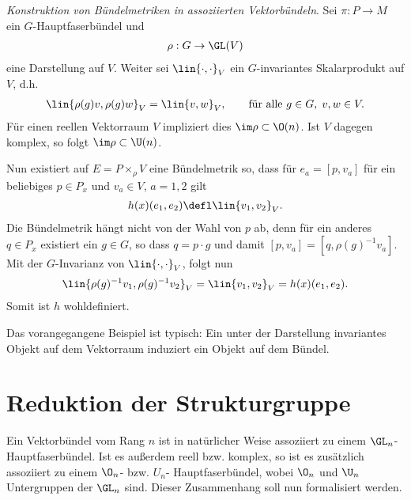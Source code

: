 \documentclass[%
	paper=a5,%
	fleqn,%
	DIV=18,%
	BCOR=0mm,
	fontsize=11pt,
	titlepage=false,%
	bibliography=totoc,
	DIV=18,%
	twoside=true,
	pdftitle=Riemannsche Geometrie,
	pdfauthor=Uwe Semmelmann,
	numbers=noendperiod]%
	{scrbook}
\begin{document}
\begin{ex}
\begin{exenum}
\item \textit{Konstruktion von Bündelmetriken in assoziierten Vektorbündeln}.
Sei $\pi: P\to M$ ein $G$-Hauptfaserbündel und
\begin{align*}
\rho: G\to \GL(V)
\end{align*}
eine Darstellung auf $V$. Weiter sei $\lin{\cdot,\cdot}_V$ ein $G$-invariantes
Skalarprodukt auf $V$, d.h.
\begin{align*}
\lin{\rho(g)v,\rho(g)w}_V = \lin{v,w}_V,\qquad \text{für alle }g\in G,\; v,w\in
V.
\end{align*}
Für einen reellen Vektorraum $V$ impliziert dies $\im
\rho\subset\O(n)$. Ist $V$ dagegen komplex, so folgt $\im\rho\subset\U(n)$.

Nun existiert auf $E=P\times_\rho V$ eine Bündelmetrik so, dass für $e_a =
[p,v_a]$ für ein beliebiges $p\in P_x$ und $v_a\in V$, $a=1,2$ gilt
\begin{align*}
h(x)(e_1,e_2) \defl \lin{v_1,v_2}_V.
\end{align*}
Die Bündelmetrik hängt nicht von der Wahl von $p$ ab, denn für ein anderes
$q\in P_x$ existiert ein $g\in G$, so dass $q = p\cdot g$ und damit $[p,v_a] =
[q,\rho(g)^{-1} v_a]$. Mit der $G$-Invarianz von $\lin{\cdot,\cdot}_V$, folgt
nun
\begin{align*}
\lin{\rho(g)^{-1}v_1,\rho(g)^{-1}v_2}_V = \lin{v_1,v_2}_V = h(x)(e_1,e_2).
\end{align*}
Somit ist $h$ wohldefiniert.
\item Das vorangegangene Beispiel ist typisch: Ein unter der Darstellung
invariantes Objekt auf dem Vektorraum induziert ein Objekt auf dem Bündel.\bsp  
\end{exenum}
\end{ex}

\section{Reduktion der Strukturgruppe}

Ein Vektorbündel vom Rang $n$ ist in natürlicher Weise assoziiert zu einem
$\GL_n$-Hauptfaserbündel. Ist es außerdem reell bzw. komplex, so ist es
zusätzlich assoziiert zu einem $\O_n$- bzw. $U_n$- Hauptfaserbündel, wobei
$\O_n$ und $\U_n$ Untergruppen der $\GL_n$ sind. Dieser Zusammenhang soll nun
formalisiert werden.
\end{document}
